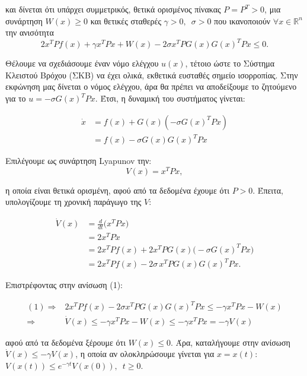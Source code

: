 \documentclass{article}
\begin{document}
\hfill\break
και δίνεται ότι υπάρχει συμμετρικός, θετικά ορισμένος πίνακας \(P = P^T > 0\), μια συνάρτηση \(W(x)\ge 0\) και θετικές σταθερές \(\gamma > 0,\,\,\,\sigma > 0\) που ικανοποιούν \(\forall x \in \mathbb{R}^n\) την ανισότητα
\begin{equation}
    2 x^T P f(x) + \gamma x^T P x + W(x) - 2 \sigma x^T P G(x) G(x)^T P x \le 0.
\end{equation}

\hfill\break
Θέλουμε να σχεδιάσουμε έναν νόμο ελέγχου \(u(x)\), τέτοιο ώστε το Σύστημα Κλειστού Βρόχου (ΣΚΒ) να έχει ολικά, εκθετικά ευσταθές σημείο ισορροπίας. Στην εκφώνηση μας δίνεται ο νόμος ελέγχου, άρα θα πρέπει να αποδείξουμε το ζητούμενο για το \(u = -\sigma G(x)^T P x\). Έτσι, η δυναμική του συστήματος γίνεται:

\begin{align*}
    \dot{x} 
    &= f(x) + G(x) (- \sigma G(x)^T P x) \\
    &= f(x) - \sigma G(x) G(x)^T P x  
\end{align*}

\hfill\break
Επιλέγουμε ως συνάρτηση Lyapunov την:
\begin{equation*}
    V(x) = x^T P x,
\end{equation*}

\hfill\break
η οποία είναι θετικά ορισμένη, αφού από τα δεδομένα έχουμε ότι \(P > 0\). Έπειτα, υπολογίζουμε τη χρονική παράγωγο της \(V\):

\begin{align*}
    \dot{V}(x)
    &= \frac{d}{dt}\big(x^{T}P x\big) \\
    &= 2x^{T}P\dot x \\
    &= 2x^{T}P f(x) + 2x^{T}P G(x)\big(-\sigma G(x)^{T}P x\big) \\
    &= 2x^{T}P f(x) - 2\sigma\, x^{T}P G(x)G(x)^{T}P x.
\end{align*}

\hfill\break
Επιστρέφοντας στην ανίσωση (1):

\hfill\break
\begin{align*}
    (1) \Rightarrow
    &2 x^T P f(x) - 2 \sigma x^T P G(x) G(x)^T P x \leq -\gamma x^T P x - W(x) \\
    \Rightarrow
    &\dot{V}(x) \leq -\gamma x^T P x - W(x) \leq -\gamma x^T P x = - \gamma V(x)
\end{align*}

\hfill\break
αφού από τα δεδομένα ξέρουμε ότι \(W(x) \leq 0\). Άρα, καταλήγουμε στην ανίσωση \(\dot{V}(x) \leq - \gamma V(x)\), η οποία αν ολοκληρώσουμε γίνεται για  \(x = x(t)\): \(V(x(t)) \leq e^{- \gamma t} V(x(0)),\,\,\, t \geq 0\).
\end{document}

